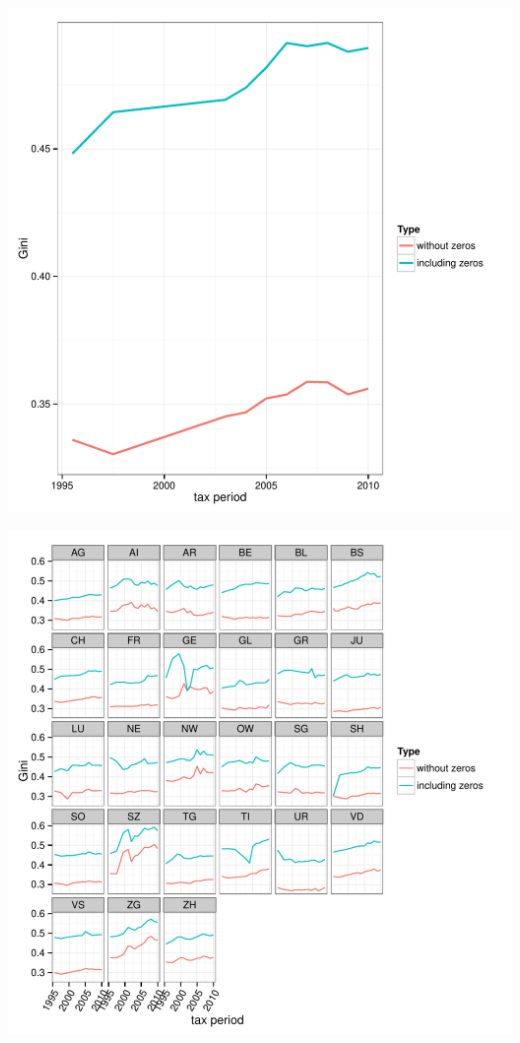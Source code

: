 \documentclass[twoside]{article}\usepackage[]{graphicx}\usepackage[]{color}
\makeatletter
\def\maxwidth{ %
  \ifdim\Gin@nat@width>\linewidth
    \linewidth
  \else
    \Gin@nat@width
  \fi
}
\newenvironment{knitrout}{}{} %
\makeatother
\begin{document}
\begin{multicols}{2}
\begin{knitrout}
\color{fgcolor}
\includegraphics[width=\maxwidth]{figure/with_without_zeros1} 

\includegraphics[width=\maxwidth]{figure/with_without_zeros2} 


\end{knitrout}
\end{multicols}
\end{document}
